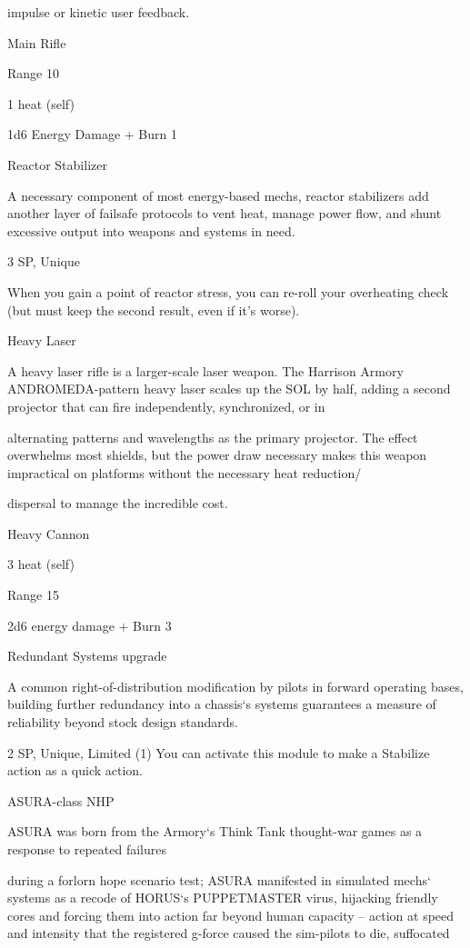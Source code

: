 impulse or kinetic user feedback.   

Main Rifle
 
Range 10
 
1 heat (self)
 
1d6 Energy Damage + Burn 1
 

Reactor Stabilizer  

A necessary component of most energy-based mechs, reactor stabilizers add another layer of failsafe  
protocols to vent heat, manage power flow, and shunt excessive output into weapons and systems in need.   

3 SP, Unique  

                                                                                                                 


When you gain a point of reactor stress, you can re-roll your overheating check (but must keep  
the second result, even if it’s worse).
 

Heavy Laser  

A heavy laser rifle is a larger-scale laser weapon. The Harrison Armory ANDROMEDA-pattern heavy laser  
scales up the SOL by half, adding a second projector that can fire independently, synchronized, or in  

alternating patterns and wavelengths as the primary projector. The effect overwhelms most shields, but the  
power draw necessary makes this weapon impractical on platforms without the necessary heat reduction/  

dispersal to manage the incredible cost.   

Heavy Cannon
 
3 heat (self)
 
Range 15
 
2d6 energy damage + Burn 3
 

Redundant Systems upgrade  

A common right-of-distribution modification by pilots in forward operating bases, building further  
redundancy into a chassis‘s systems guarantees a measure of reliability beyond stock design standards.   

2 SP, Unique, Limited (1)  
You can activate this module to make a Stabilize action as a quick action.
 

ASURA-class NHP  

ASURA was born from the Armory‘s Think Tank thought-war games as a response to repeated failures  

during a forlorn hope scenario test; ASURA manifested in simulated mechs‘ systems as a recode of  
HORUS‘s PUPPETMASTER virus, hijacking friendly cores and forcing them into action far beyond human  
capacity -- action at speed and intensity that the registered g-force caused the sim-pilots to die, suffocated  


